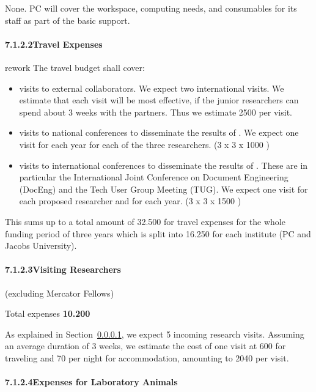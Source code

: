 None.  PC will cover the workspace, computing needs, and consumables for its staff as part
of the basic support.

\paragraph{7.1.2.2\quad Travel Expenses}
\label{sec:travel}

\begin{oldpart}{rework}
  The travel budget shall cover:
  \begin{itemize}
  \item visits to external collaborators. We expect two international visits. We estimate
    that each visit will be most effective, if the junior researchers can spend about 3
    weeks with the partners. Thus we estimate 2500 {\texteuro} per visit.
  \item visits to national conferences to disseminate the results of {\pn}. We expect
    one visit for each year for each of the three researchers. (3 x 3 x 1000 {\texteuro})
  \item visits to international conferences to disseminate the results of {\pn}. These
    are in particular the International Joint Conference on Document Engineering (DocEng)
    and the Tech User Group Meeting (TUG). We expect one visit for each proposed
    researcher and for each year. (3 x 3 x 1500 {\texteuro})
  \end{itemize}

  This sums up to a total amount of 32.500 {\texteuro} for travel expenses for the whole
  funding period of three years which is split into 16.250 {\texteuro} for each institute
  (PC and Jacobs University).
\end{oldpart}

\paragraph{7.1.2.3\quad Visiting Researchers} (excluding Mercator Fellows)
\label{sec:funds:visiting}

Total expenses \textbf{10.200 \texteuro}
\medskip

As explained in Section~\ref{sec:travel}, we expect 5 incoming research visits.  Assuming
an average duration of 3 weeks, we estimate the cost of one visit at 600 {\texteuro} for
traveling and 70 {\texteuro} per night for accommodation, amounting to 2040 \texteuro per
visit.

\paragraph{7.1.2.4\quad Expenses for Laboratory Animals}

